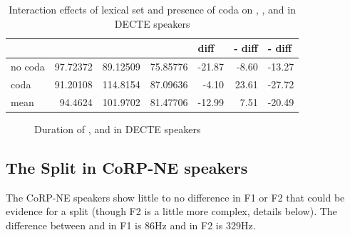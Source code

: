 \documentclass[../../../00.FullDoc/tex/APRReport-year4]{subfiles}
\begin{document}

\begin{table}[htbp]
	\centering

	\begin{tabular}{lrrrrrr}
		\hline
		& \multicolumn{1}{l}{\bath{}} & \multicolumn{1}{l}{\palm{}} & \multicolumn{1}{l}{\trap{}} & \multicolumn{1}{l}{\TB{} diff} & \multicolumn{1}{l}{\palm{}-\bath{} diff} & \multicolumn{1}{l}{\trap{}-\palm{} diff} \\
		\hline
		no coda & 97.72372 & 89.12509 & 75.85776 & -21.87 & -8.60 & -13.27 \\
		coda & 91.20108 & 114.8154 & 87.09636 & -4.10 & 23.61 & -27.72 \\
		\hline
		mean  & 94.4624 & 101.9702 & 81.47706 & -12.99 & 7.51  & -20.49 \\
		\hline
	\end{tabular}%
		\caption{Interaction effects of lexical set and presence of coda on \trap{}, \bath{}, and \palm{} in DECTE speakers} \label{tbl:TBPdurDE-inter}%
\end{table}%


\begin{figure}[h]
	
	\caption{Duration of \trap{}, \bath{} and \palm{}  in DECTE speakers} \label{fig:TBdurDE}
\end{figure}

\subsection{The Split in CoRP-NE speakers}
The CoRP-NE speakers show little to no difference in F1 or F2 that could be evidence for a \TB{} split (though F2 is a little more complex, details below). The difference between \trap{} and \palm{} in F1 is 86Hz and in F2 is 329Hz.
\end{document}
